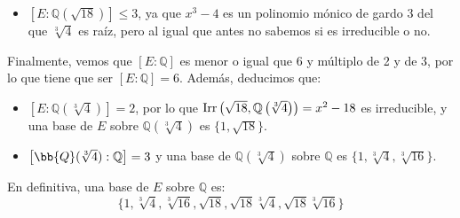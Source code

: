 \begin{ejercicio}
\begin{enumerate}[label=\alph*)]
\begin{itemize}
                \item $\left[E:\mathbb{Q}\left(\sqrt{18}\right)\right] \leq 3$, ya que $x^3-4$ es un polinomio mónico de gardo 3 del que $\sqrt[3]{4}$ es raíz, pero al igual que antes no sabemos si es irreducible o no.
            \end{itemize}
            Finalmente, vemos que $[E:\mathbb{Q}]$ es menor o igual que $6$ y múltiplo de 2 y de 3, por lo que tiene que ser $[E:\mathbb{Q}] = 6$. Además, deducimos que:
            \begin{itemize}
                \item $\left[E:\mathbb{Q}\left(\sqrt[3]{4}\right)\right] = 2$, por lo que $\operatorname{Irr}\left(\sqrt{18},\mathbb{Q}\left(\sqrt[3]{4}\right)\right) = x^2-18$ es irreducible, y una base de $E$ sobre $\mathbb{Q}\left(\sqrt[3]{4}\right)$ es $\{1,\sqrt{18}\}$.
                \item $\left[\bb{Q}(\sqrt[3]{4}):\mathbb{Q}\right] = 3$ y una base de $\mathbb{Q}\left(\sqrt[3]{4}\right)$ sobre $\mathbb{Q}$ es $\{1,\sqrt[3]{4},\sqrt[3]{16}\}$.
            \end{itemize}

            En definitiva, una base de $E$ sobre $\mathbb{Q}$ es:
            \begin{equation*}
                \{1, \sqrt[3]{4}, \sqrt[3]{16}, \sqrt{18}, \sqrt{18}\sqrt[3]{4}, \sqrt{18}\sqrt[3]{16}\}
            \end{equation*}
    \end{enumerate}
\end{ejercicio}

